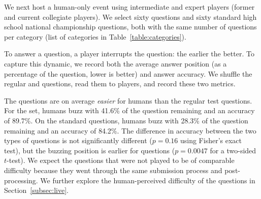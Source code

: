 We next host a human-only \qb{} event using intermediate
and expert players (former and current collegiate \qb{} players).
We select sixty \challenge{} questions and sixty standard high
school national championship questions, both with the same number of
questions per category (list of categories in Table~\ref{table:categories}).

To answer a \qb{} question, a player interrupts the question: the
earlier the better.  To capture this dynamic, we
record both the average answer
position (as a percentage of the question, lower is better) and 
answer accuracy. We shuffle the regular and \challenge{}
questions, read them to players, and record these two metrics. 

The \challenge{} questions are on average \emph{easier} for humans
than the regular test questions. For the \challenge{} set, humans buzz
with 41.6\% of the question 
remaining and an accuracy of 89.7\%. On the standard questions, humans
buzz with 28.3\% of the question remaining and an accuracy of
84.2\%. The difference in accuracy between the two types of questions
is not significantly different ($p = 0.16$ using Fisher's exact test),
but the buzzing position is earlier for \challenge{}
questions ($p = 0.0047$ for a two-sided $t$-test). We expect the questions
that were not played to be of comparable difficulty because they went through
the same submission process and post-processing. We further explore the
human-perceived difficulty of the \challenge{} questions in Section~\ref{subsec:live}.